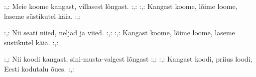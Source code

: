 :,: Meie koome kangast, villasest l\~ongast. :,: 
:,: Kangast koome, l\~oime loome,
laseme s\"ustikutel k\"aia. :,: 

:,: Nii seati niied, neljad ja viied. :,: 
:,: Kangast koome, l\~oime loome,
laseme s\"ustikutel k\"aia. :,: 

:,: Nii koodi kangast, sini-musta-valgest l\~ongast :,: 
:,: Kangast koodi, priius loodi,
Eesti kodutalu \~oues. :,: 
